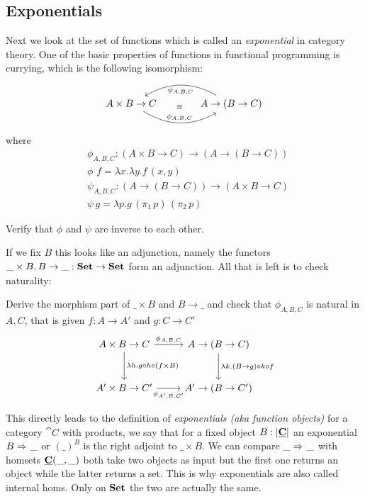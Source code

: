 \subsection{Exponentials}
\label{sec:exponentials}

Next we look at the set of functions which is called an \emph{exponential} in category theory. One of the basic properties of functions in functional programming is currying, which is the following isomorphism:
\[\begin{tikzcd}[column sep = large]
A\times B \to C \arrow[r,"\phi_{A,B,C}",bend right,"\cong" above=11] & A\to(B \to C) \arrow[l,"\psi_{A,B,C}",bend right]
\end{tikzcd}\]
where
\begin{align*}
  &\phi_{A,B,C} : (A\times B \to C) \to (A\to(B \to C))\\
  &\phi\,\,f = \lambda x.\lambda y.f\,(x,y)\\
  &\psi_{A,B,C} : (A\to(B \to C)) \to (A\times B \to C) \\
  &\psi\,g = \lambda p.g\,(\pi_1\,p)\,(\pi_2\,p)
\end{align*}
\begin{Exercise}
  Verify that $\phi$ and $\psi$ are inverse to each other.
\end{Exercise}
If we fix $B$ this looks like an adjunction, namely the functors $\_\times B, B \to \_ : \mathbf{Set} \to \mathbf{Set}$ form an adjunction. All that is left is to check naturality:
\begin{Exercise}
  Derive the morphism part of $\_\times B$ and $B \to \_$ and
  check that $\phi_{A,B,C}$ is natural in $A,C$, that is given $f : A \to A'$ and $g : C \to C'$
\[\begin{tikzcd}[row sep = large]
   A\times B \to C \arrow[r,"\phi_{A,B,C}"] \arrow[d,"\lambda h. g\circ h \circ (f \times B)"] & A\to(B \to C) \arrow[d,"\lambda k. (B \to g)\circ k \circ f"] \\
   A'\times B \to C'  \arrow[r,"\phi_{A',B,C'}" below]  & A'\to(B \to C') 
\end{tikzcd}\]  
\end{Exercise}

This directly leads to the definition of \emph{exponentials (aka function objects)} for a category $\cat{C}$ with products, we say that for a fixed object $B:|\underline{\mathbf{C}}|$ an exponential $B\Rightarrow_{} \_$ or $(\_)^B$ is the right adjoint to $\_ \times B$. We can compare $\_\Rightarrow_{} \_$ with homsets $\underline{\mathbf{C}}(\_,\_)$ both take two objects as input but the first one returns an object while the latter returns a set. This is why exponentials are also called internal homs. Only on $\mathbf{Set}$ the two are actually the same.

